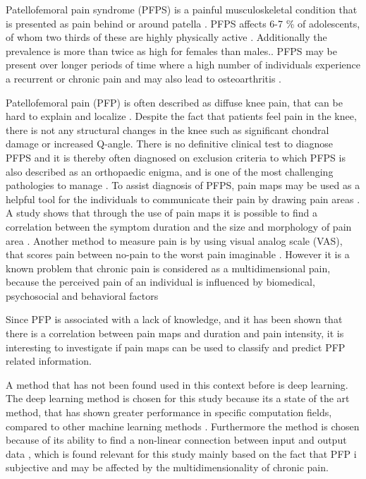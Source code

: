Patellofemoral pain syndrome (PFPS) is a painful musculoskeletal condition that is presented as pain behind or around patella \citep{Maclachlan2017, Smith2015}. PFPS affects 6-7 \% of adolescents, of whom two thirds of these are highly physically active \citep{Rathleff2015}. Additionally the prevalence is more than twice as high for females than males.\citep{Petersen2013, Rathleff2015}.
PFPS may be present over longer periods of time where a high number of individuals experience a recurrent or chronic pain \citep{Witvrouw2014} and may also lead to osteoarthritis \citep{Petersen2013, Crossley2016}.

\noindent
Patellofemoral pain (PFP) is often described as diffuse knee pain, that can be hard to explain and localize \citep{Witvrouw2014}. Despite the fact that patients feel pain in the knee, there is not any structural changes in the knee such as significant chondral damage or increased Q-angle. There is no definitive clinical test to diagnose PFPS and it is thereby often diagnosed on exclusion criteria \citep{Petersen2013} to which PFPS is also described as an orthopaedic enigma, and is one of the most challenging pathologies to manage \citep{Dye2001}. 
To assist diagnosis of PFPS, pain maps may be used as a helpful tool for the individuals to communicate their pain by drawing pain areas \citep{Boudreau2016}. A study shows that through the use of pain maps it is possible to find a correlation between the symptom duration and the size and morphology of pain area \citep{Boudreau2017}. 
Another method to measure pain is by using visual analog scale (VAS), that scores pain between no-pain to the worst pain imaginable \citep{Haefeli2005}. However it is a known problem that chronic pain is considered as a multidimensional pain, because the perceived pain of an individual is influenced by biomedical, psychosocial and behavioral factors \citep{Dansie2013}

\noindent
Since PFP is associated with a lack of knowledge, and it has been shown that there is a correlation between pain maps and duration and pain intensity, it is interesting to investigate if pain maps can be used to classify and predict PFP related information. 

\noindent
A method that has not been found used in this context before is deep learning. The deep learning method is chosen for this study because its a state of the art method, that has shown greater performance in specific computation fields, compared to other machine learning methods \citep{LeCun2015}.
Furthermore the method is chosen because of its ability to find a non-linear connection between input and output data \citep{LeCun2015}, which is found relevant for this study mainly based on the fact that PFP i subjective and may be affected by the multidimensionality of chronic pain.  \\



